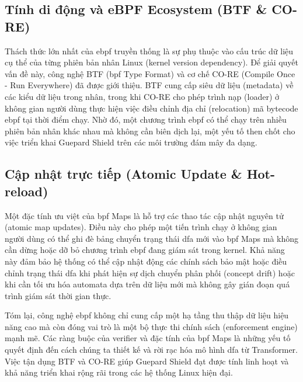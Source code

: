 \documentclass[../main.tex]{subfiles}
\begin{document}
\subsection{Tính di động và eBPF Ecosystem (BTF \& CO-RE)}
Thách thức lớn nhất của \gls{ebpf} truyền thống là sự phụ thuộc vào cấu
trúc dữ liệu cụ thể của từng phiên bản nhân Linux (kernel version
dependency). Để giải quyết vấn đề này, công nghệ BTF (\gls{bpf} Type
Format) và cơ chế CO-RE (Compile Once - Run Everywhere) đã được giới
thiệu. BTF cung cấp siêu dữ liệu (metadata) về các kiểu dữ liệu trong
nhân, trong khi CO-RE cho phép trình nạp (loader) ở không gian người
dùng thực hiện việc điều chỉnh địa chỉ (relocation) mã bytecode \gls{ebpf}
tại thời điểm chạy. Nhờ đó, một chương trình \gls{ebpf} có thể chạy trên
nhiều phiên bản nhân khác nhau mà không cần biên dịch lại, một yếu tố
then chốt cho việc triển khai Guepard Shield trên các môi trường đám
mây đa dạng.

\subsection{Cập nhật trực tiếp (Atomic Update \& Hot-reload)}
Một đặc tính ưu việt của \gls{bpf} Maps là hỗ trợ các thao tác cập nhật
nguyên tử (atomic map updates). Điều này cho phép một tiến trình chạy
ở không gian người dùng có thể ghi đè bảng chuyển trạng thái \gls{dfa} mới
vào \gls{bpf} Maps mà không cần dừng hoặc dỡ bỏ chương trình \gls{ebpf} đang giám
sát trong kernel. Khả năng này đảm bảo hệ thống có thể cập nhật động
các chính sách bảo mật hoặc điều chỉnh trạng thái \gls{dfa} khi phát hiện
sự dịch chuyển phân phối (concept drift) hoặc khi cần tối ưu hóa
automata dựa trên dữ liệu mới mà không gây gián đoạn quá trình giám
sát thời gian thực.

Tóm lại, công nghệ \gls{ebpf} không chỉ cung cấp một hạ tầng thu thập dữ
liệu hiệu năng cao mà còn đóng vai trò là một bộ thực thi chính sách
(enforcement engine) mạnh mẽ. Các ràng buộc của verifier và đặc tính
của \gls{bpf} Maps là những yếu tố quyết định đến cách chúng ta thiết kế và
rời rạc hóa mô hình \gls{dfa} từ Transformer. Việc tận dụng BTF và CO-RE
giúp Guepard Shield đạt được tính linh hoạt và khả năng triển khai
rộng rãi trong các hệ thống Linux hiện đại.
\end{document}
